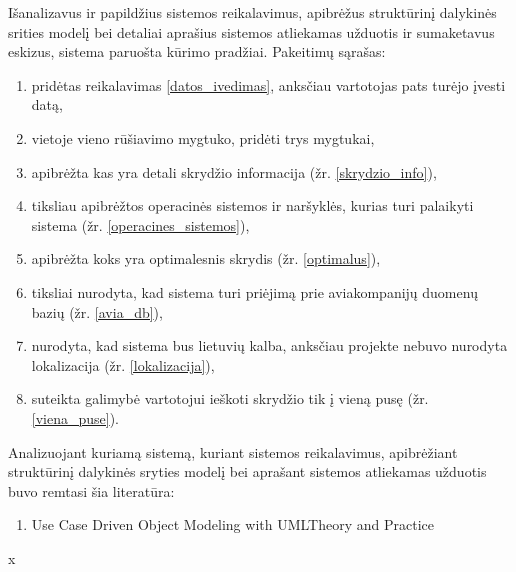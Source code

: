 \documentclass{VUMIFPSkursinis}
\begin{document}
			Išanalizavus ir papildžius sistemos reikalavimus, apibrėžus struktūrinį dalykinės srities modelį bei detaliai aprašius sistemos atliekamas užduotis ir sumaketavus eskizus, sistema paruošta kūrimo pradžiai.
			Pakeitimų sąrašas:
			\begin{enumerate}
				\item pridėtas reikalavimas \ref{datos_ivedimas}, anksčiau vartotojas pats turėjo įvesti datą,
				\item vietoje vieno rūšiavimo mygtuko, pridėti trys mygtukai,
				\item apibrėžta kas yra detali skrydžio informacija (žr. \ref{skrydzio_info}),
				\item tiksliau apibrėžtos operacinės sistemos ir naršyklės, kurias turi palaikyti sistema (žr. \ref{operacines_sistemos}),
				\item apibrėžta koks yra optimalesnis skrydis (žr. \ref{optimalus}),
				\item tiksliai nurodyta, kad sistema turi priėjimą prie aviakompanijų duomenų bazių (žr. \ref{avia_db}),
				\item nurodyta, kad sistema bus lietuvių kalba, anksčiau projekte nebuvo nurodyta lokalizacija (žr. \ref{lokalizacija}),
				\item suteikta galimybė vartotojui ieškoti skrydžio tik į vieną pusę (žr. \ref{viena_puse}).
			\end{enumerate}
        Analizuojant kuriamą sistemą, kuriant sistemos reikalavimus, apibrėžiant struktūrinį dalykinės sryties modelį bei aprašant sistemos atliekamas užduotis buvo remtasi šia literatūra:
            \begin{enumerate}
                \item Use Case Driven Object Modeling with UMLTheory and Practice 
            \end{enumerate}x
      
    
\end{document}
